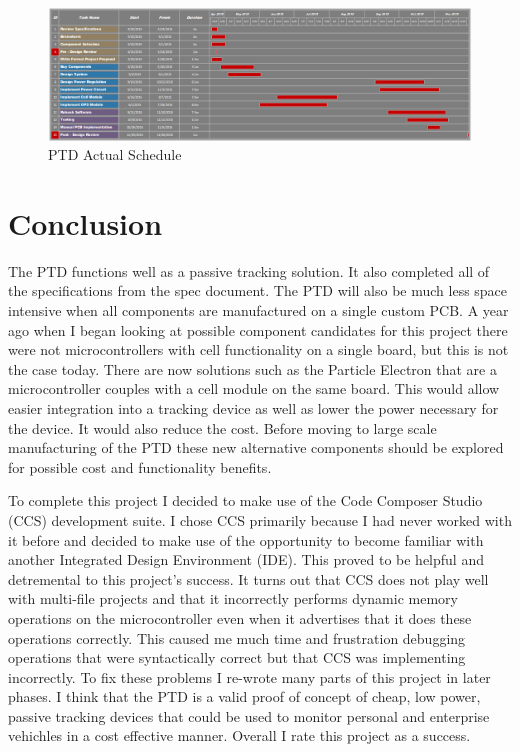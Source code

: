 \documentclass[11pt]{article}
\begin{document}
\begin{figure}[H]
    \centering
        \includegraphics[scale=0.5]{gantt_actual.png}
    \caption{PTD Actual Schedule}
    \label{fig:gantt_actual}
\end{figure}


\section{Conclusion}
The PTD functions well as a passive tracking solution. It also completed all of the specifications from the spec document. The PTD will also be much less space intensive when all components are manufactured on a single
custom PCB. A year ago when I began looking at possible component candidates for this project there were not microcontrollers with cell functionality on a single board, but this is not the case today. 
There are now solutions such as the Particle Electron that are a microcontroller couples with a cell module on the same board. This would allow easier integration into a tracking device as well as lower
the power necessary for the device. It would also reduce the cost. Before moving to large scale  manufacturing of the PTD these new alternative components should be explored for possible cost and functionality
benefits.

To complete this project I decided to make use of the Code Composer Studio (CCS) development suite. I chose CCS primarily because I had never worked with it before and decided to make use of the opportunity 
to become familiar with another Integrated Design Environment (IDE). This proved to be helpful and detremental to this project's success. It turns out that CCS does not play well with multi-file projects and
that it incorrectly performs dynamic memory operations on the microcontroller even when it advertises that it does these operations correctly. This caused me much time and frustration debugging operations that
were syntactically correct but that CCS was implementing incorrectly. To fix these problems I re-wrote many parts of this project in later phases. I think that the PTD is a valid proof of concept of cheap, low 
power, passive tracking devices that could be used to monitor personal and enterprise vehichles in a cost effective manner. Overall I rate this project as a success.   
\end{document}

